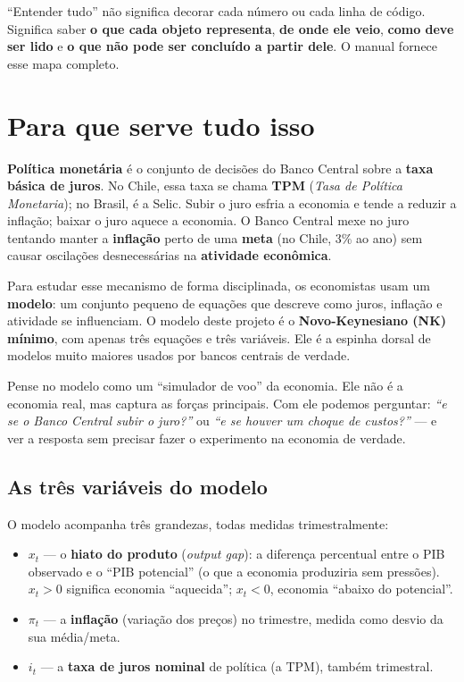 \documentclass[11pt,a4paper]{article}
\begin{document}
\begin{atencao}
``Entender tudo'' não significa decorar cada número ou cada linha de código. Significa saber
\textbf{o que cada objeto representa}, \textbf{de onde ele veio}, \textbf{como deve ser lido} e
\textbf{o que não pode ser concluído a partir dele}. O manual fornece esse mapa completo.
\end{atencao}

\section{Para que serve tudo isso}

\textbf{Política monetária} é o conjunto de decisões do Banco Central sobre a \textbf{taxa básica de
juros}. No Chile, essa taxa se chama \textbf{TPM} (\emph{Tasa de Política Monetaria}); no Brasil, é a
Selic. Subir o juro esfria a economia e tende a reduzir a inflação; baixar o juro aquece a economia.
O Banco Central mexe no juro tentando manter a \textbf{inflação} perto de uma \textbf{meta} (no Chile,
3\% ao ano) sem causar oscilações desnecessárias na \textbf{atividade econômica}.

Para estudar esse mecanismo de forma disciplinada, os economistas usam um \textbf{modelo}: um conjunto
pequeno de equações que descreve como juros, inflação e atividade se influenciam. O modelo deste
projeto é o \textbf{Novo-Keynesiano (NK) mínimo}, com apenas três equações e três variáveis. Ele é a
espinha dorsal de modelos muito maiores usados por bancos centrais de verdade.

\begin{intuicao}
Pense no modelo como um ``simulador de voo'' da economia. Ele não é a economia real, mas captura as
forças principais. Com ele podemos perguntar: \emph{``e se o Banco Central subir o juro?''} ou
\emph{``e se houver um choque de custos?''} --- e ver a resposta sem precisar fazer o experimento na
economia de verdade.
\end{intuicao}

\subsection{As três variáveis do modelo}
O modelo acompanha três grandezas, todas medidas trimestralmente:
\begin{itemize}[nosep]
  \item $x_t$ --- o \textbf{hiato do produto} (\emph{output gap}): a diferença percentual entre o PIB
        observado e o ``PIB potencial'' (o que a economia produziria sem pressões). $x_t>0$ significa
        economia ``aquecida''; $x_t<0$, economia ``abaixo do potencial''.
  \item $\pi_t$ --- a \textbf{inflação} (variação dos preços) no trimestre, medida como desvio da sua
        média/meta.
  \item $i_t$ --- a \textbf{taxa de juros nominal} de política (a TPM), também trimestral.
\end{itemize}
\end{document}
